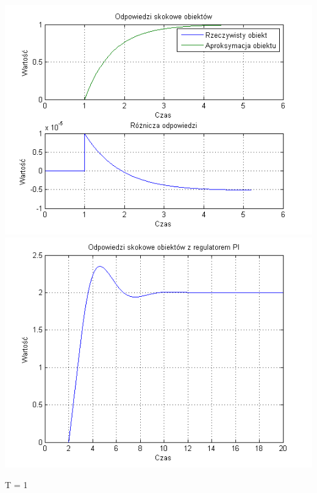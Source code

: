 \documentclass[10pt,a4paper]{article}
\begin{document}
\begin{center}
\includegraphics[scale=1]{images/jeden/skrypt_13.png}\\
\includegraphics[scale=1]{images/jeden/skrypt_14.png}\\
\end{center}
\newpage
T = 1
\end{document}
